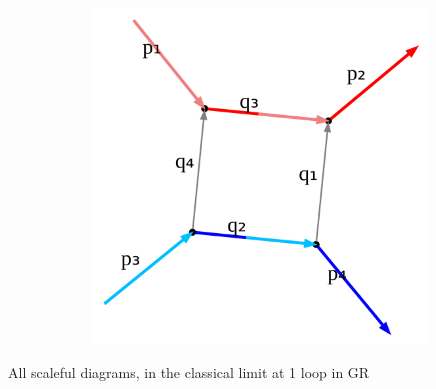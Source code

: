 \documentclass[
  11pt,
  a4paper,
  DIV=11,
  numbers=noendperiod,
  twoside]{scrreprt}
\DeclareRobustCommand{\[}{\begin{equation}}
\DeclareRobustCommand{\]}{\end{equation}}
\begin{document}
\hypertarget{fig-1lGRclassical}{}
{
\makeatletter
\def\LT@makecaption#1#2#3{%
  \noalign{\smash{\hbox{\kern\textwidth\rlap{\kern\marginparsep
  \parbox[t]{\marginparwidth}{%
    \footnotesize{%
      \vspace{(1.1\baselineskip)}
    #1{#2: }\ignorespaces #3}}}}}}%
    }
\makeatother

\begin{figure}[H]

{\centering \includegraphics[width=8in,height=3.5in]{./scattering_files/figure-latex/dot-figure-3.png}

}

\end{figure}

\label{fig-1lGRclassical}All scaleful diagrams, in the classical limit
at 1 loop in GR

}
\end{document}
